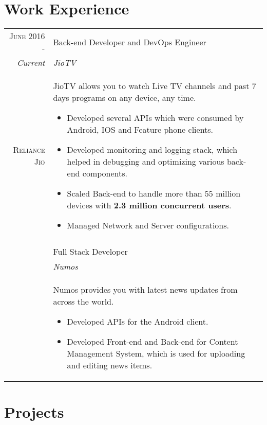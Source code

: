 \documentclass[a4paper,10pt]{article}
\begin{document}
\section{Work Experience}
\begin{tabular}{r|p{11cm}}
 \textsc{June 2016 -} & Back-end Developer and DevOps Engineer \\\emph{Current}&\emph{JioTV}\\\textsc{Reliance Jio}&\footnotesize{JioTV allows you to watch Live TV channels and past 7 days programs on any device, any time. 
 \begin{itemize} 
 \item Developed several APIs which were consumed by Android, IOS and Feature phone clients.
 \item Developed monitoring and logging stack, which helped in debugging and optimizing various back-end components. 
 \item Scaled Back-end to handle more than 55 million devices with \textbf{2.3 million concurrent users}.
 \item Managed Network and Server configurations.
  \end{itemize}} \\
 \\
 \emph{} & Full Stack Developer \\\textsc{}&
 \emph{Numos}\\&\footnotesize{Numos provides you with latest news updates from across the world. 
 \begin{itemize}
 \item Developed APIs for the Android client. 
 \item Developed Front-end and Back-end for Content Management System, which is used for uploading and editing news items.
 \end{itemize}
 } \\
\end{tabular}

\section{Projects} 
\end{document}
